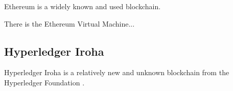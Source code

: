 Ethereum is a widely known and used blockchain.

There is the Ethereum Virtual Machine...


\subsection{Hyperledger Iroha} %
\label{sub:Hyperledger Iroha}

Hyperledger Iroha is a relatively new and unknown blockchain from the Hyperledger Foundation \cite{hyperledger:wiki}.


